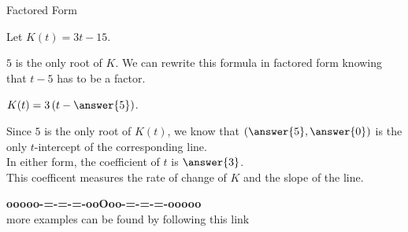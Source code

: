 \documentclass{ximera}
\begin{document}
\begin{example}  Factored Form



Let $K(t) = 3t - 15$.


$5$ is the only root of $K$.  We can rewrite this formula in factored form knowing that $t-5$ has to be a factor.


$K(t) = 3 \left(t - \answer{5} \right)$.



Since $5$ is the only root of $K(t)$, we know that $\left(\answer{5}, \answer{0}\right)$ is the only $t$-intercept of the corresponding line.  \\

In either form, the coefficient of $t$ is $\answer{3}$.  \\

This coefficent measures the rate of change of $K$ and the slope of the line.

\end{example}




















\begin{center}
\textbf{\textcolor{green!50!black}{ooooo-=-=-=-ooOoo-=-=-=-ooooo}} \\

more examples can be found by following this link\\ 

\end{center}
\end{document}
